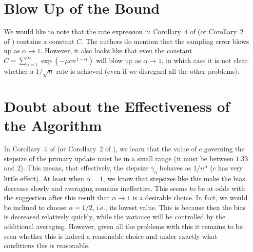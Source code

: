\documentclass{article}
\begin{document}
\section{Blow Up of the Bound}
We would like to note that the rate expression in Corollary~4 of \cite{flstda} (or Corollary~2 of \cite{flstd}) contains a constant $C$. The authors do mention that the sampling error blows up as $\alpha \rightarrow 1$.
However, it also looks like that even the constant $C=\sum_{n=1}^\infty \exp(-\mu cn^{1-\alpha})$ will blow up as $\alpha\rightarrow 1$, in which case it is not clear whether a $1/\sqrt{n}$ rate is achieved (even if we disregard all the other problems).

\section{Doubt about the Effectiveness of the Algorithm}
In Corollary~4 of \cite{flstda} (or Corollary~2 of \cite{flstd}), we learn that the value of $c$ governing the stepsize of the primary update must be in a small range (it must be between $1.33$ and $2$). This means, that effectively, the stepsize $\gamma_n$ behaves as $1/n^\alpha$ ($c$ has very little effect). At least when $\alpha=1$, we know that stepsizes like this make the bias decrease slowly and averaging remains ineffective. This seems to be at odds with the suggestion after this result that $\alpha\to 1$ is a desirable choice. In fact, we would be inclined to choose $\alpha=1/2$, i.e., its lowest value. This is because then the bias is decreased relatively quickly, while the variance will be controlled by the additional averaging. However, given all the problems with this it remains to be seen whether this is indeed a reasonable choice and under exactly what conditions this is reasonable.


%




\end{document}
